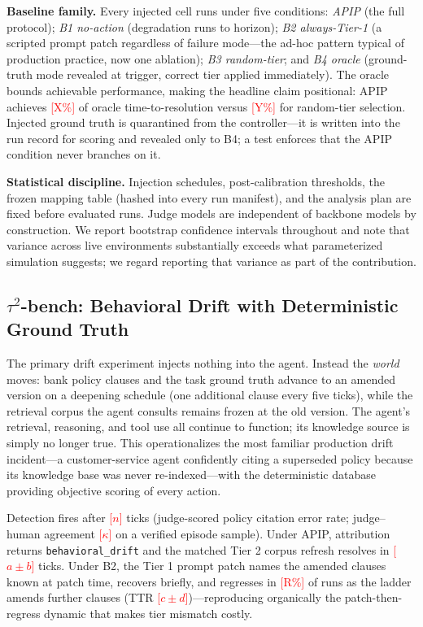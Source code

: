 \documentclass[conference]{IEEEtran}
\newcommand{\pending}[1]{\textcolor{red}{[#1]}}
\newcommand{\ttrOraclePct}{\pending{X\%}}        %
\newcommand{\ttrRandomPct}{\pending{Y\%}}        %
\newcommand{\tauDetectLag}{\pending{$n$}}        %
\newcommand{\tauTTRapip}{\pending{$a \pm b$}}    %
\newcommand{\tauTTRbtwo}{\pending{$c \pm d$}}    %
\newcommand{\tauBtwoRegressPct}{\pending{R\%}}   %
\newcommand{\tauCitationJudgeAgree}{\pending{$\kappa$}} %
\begin{document}
\textbf{Baseline family.} Every injected cell runs under five conditions:
\emph{APIP} (the full protocol); \emph{B1 no-action} (degradation runs to
horizon); \emph{B2 always-Tier-1} (a scripted prompt patch regardless of
failure mode---the ad-hoc pattern typical of production practice, now one
ablation); \emph{B3 random-tier}; and \emph{B4 oracle} (ground-truth
mode revealed at trigger, correct tier applied immediately). The oracle bounds
achievable performance, making the headline claim positional: APIP achieves
\ttrOraclePct{} of oracle time-to-resolution versus \ttrRandomPct{} for
random-tier selection. Injected ground truth is quarantined from the
controller---it is written into the run record for scoring and revealed only
to B4; a test enforces that the APIP condition never branches on it.

\textbf{Statistical discipline.} Injection schedules, post-calibration
thresholds, the frozen mapping table (hashed into every run manifest), and the
analysis plan are fixed before evaluated runs. Judge models are independent of
backbone models by construction. We report bootstrap confidence intervals
throughout and note that variance across live environments substantially
exceeds what parameterized simulation suggests; we regard reporting that
variance as part of the contribution.

\subsection{$\tau^2$-bench: Behavioral Drift with Deterministic Ground Truth}
\label{subsec:eval-tau}

The primary drift experiment injects nothing into the agent. Instead the
\emph{world} moves: bank policy clauses and the task ground truth advance to
an amended version on a deepening schedule (one additional clause every five
ticks), while the retrieval corpus the agent consults remains frozen at the
old version. The agent's retrieval, reasoning, and tool use all continue to
function; its knowledge source is simply no longer true. This operationalizes
the most familiar production drift incident---a customer-service agent
confidently citing a superseded policy because its knowledge base was never
re-indexed---with the deterministic database providing objective scoring of
every action.

Detection fires after \tauDetectLag{} ticks (judge-scored policy citation
error rate; judge--human agreement \tauCitationJudgeAgree{} on a verified
episode sample). Under APIP, attribution returns \texttt{behavioral\_drift}
and the matched Tier 2 corpus refresh resolves in \tauTTRapip{} ticks. Under
B2, the Tier 1 prompt patch names the amended clauses known at patch time,
recovers briefly, and regresses in \tauBtwoRegressPct{} of runs as the ladder
amends further clauses (TTR \tauTTRbtwo{})---reproducing organically the
patch-then-regress dynamic that makes tier mismatch costly.
\end{document}

